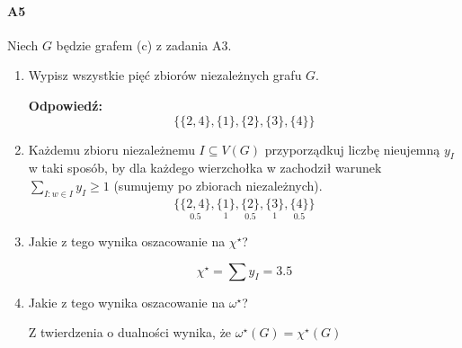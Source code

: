 \paragraph{A5} Niech $G$ będzie grafem (c) z zadania A3.
\begin{enumerate}[label=\alph*)]
\item Wypisz wszystkie pięć zbiorów niezależnych grafu $G$.

\textbf{Odpowiedź:}
$$\{\{2,4\},\{1\},\{2\},\{3\},\{4\}\}$$
\item Każdemu zbioru niezależnemu $I \subseteq V(G)$ przyporządkuj liczbę nieujemną $y_I$ w taki sposób, by dla każdego wierzchołka w zachodził warunek $\sum _{I:w \in I}y_I \geq 1$ (sumujemy po zbiorach niezależnych).
$$\{\underset{0.5}{\{2,4\}},\underset{1}{\{1\}},\underset{0.5}{\{2\}},\underset{1}{\{3\}},\underset{0.5}{\{4\}}\}$$
\item Jakie z tego wynika oszacowanie na $\chi ^\star$?

$$\chi ^\star = \sum y_I=3.5$$
\item Jakie z tego wynika oszacowanie na $\omega ^\star$?

Z twierdzenia o dualności wynika, że $\omega ^\star (G) = \chi ^\star (G)$
\end{enumerate}

